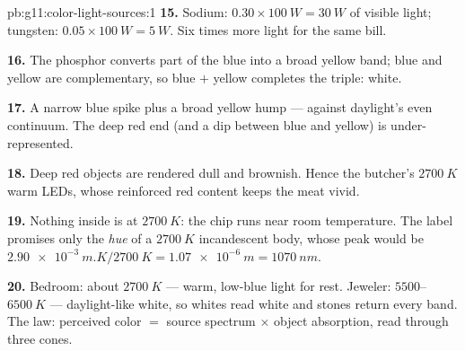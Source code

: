 \begin{solution}{pb:g11:color-light-sources:1}
\textbf{15.} Sodium: $0.30 \times \qty{100}{W} = \qty{30}{W}$ of
visible light; tungsten: $0.05 \times \qty{100}{W} = \qty{5}{W}$. Six
times more light for the same bill.

\textbf{16.} The phosphor converts part of the blue into a broad yellow
band; blue and yellow are complementary, so blue $+$ yellow completes
the triple: white.

\textbf{17.} A narrow blue spike plus a broad yellow hump --- against
daylight's even continuum. The deep red end (and a dip between blue and
yellow) is under-represented.

\textbf{18.} Deep red objects are rendered dull and brownish. Hence the
butcher's $\qty{2700}{K}$ warm LEDs, whose reinforced red content keeps
the meat vivid.

\textbf{19.} Nothing inside is at $\qty{2700}{K}$: the chip runs near
room temperature. The label promises only the \emph{hue} of a
$\qty{2700}{K}$ incandescent body, whose peak would be
$\qty{2.90e-3}{m.K}/\qty{2700}{K} = \qty{1.07e-6}{m} = \qty{1070}{nm}$.

\textbf{20.} Bedroom: about $\qty{2700}{K}$ --- warm, low-blue light
for rest. Jeweler: $5500$--$\qty{6500}{K}$ --- daylight-like white, so
whites read white and stones return every band. The law: perceived
color $=$ source spectrum $\times$ object absorption, read through
three cones.
\end{solution}
